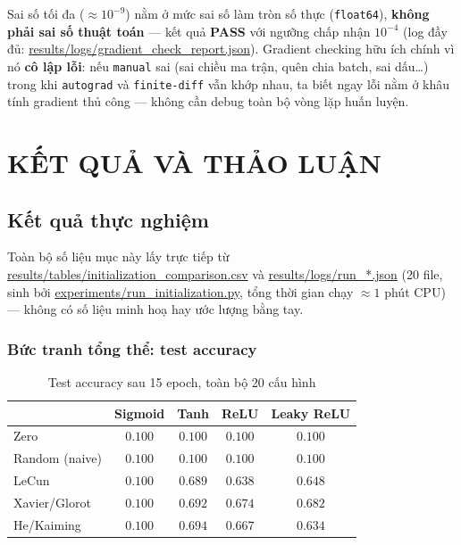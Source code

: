 \documentclass[12pt,a4paper]{report}
\begin{document}
Sai số tối đa ($\approx10^{-9}$) nằm ở mức sai số làm tròn số thực
(\texttt{float64}), \textbf{không phải sai số thuật toán} --- kết quả
\textbf{PASS} với ngưỡng chấp nhận $10^{-4}$ (log đầy đủ:
\url{results/logs/gradient_check_report.json}). Gradient checking hữu
ích chính vì nó \textbf{cô lập lỗi}: nếu \texttt{manual} sai (sai chiều ma
trận, quên chia batch, sai dấu\ldots) trong khi \texttt{autograd} và
\texttt{finite-diff} vẫn khớp nhau, ta biết ngay lỗi nằm ở khâu tính
gradient thủ công --- không cần debug toàn bộ vòng lặp huấn luyện.

\chapter{KẾT QUẢ VÀ THẢO LUẬN}
\section{Kết quả thực nghiệm}
\label{sec:results}

Toàn bộ số liệu mục này lấy trực tiếp từ
\url{results/tables/initialization_comparison.csv} và
\url{results/logs/run_*.json} (20 file, sinh bởi
\url{experiments/run_initialization.py}, tổng thời gian chạy $\approx1$
phút CPU) --- không có số liệu minh hoạ hay ước lượng bằng tay.

\subsection{Bức tranh tổng thể: test accuracy}

\begin{table}[htbp]
\centering
\caption{Test accuracy sau 15 epoch, toàn bộ 20 cấu hình}
\begin{tabular}{@{}lcccc@{}}
\toprule
 & Sigmoid & Tanh & ReLU & Leaky ReLU \\
\midrule
Zero & $0.100$ & $0.100$ & $0.100$ & $0.100$ \\
Random (naive) & $0.100$ & $0.100$ & $0.100$ & $0.100$ \\
LeCun & $0.100$ & $0.689$ & $0.638$ & $0.648$ \\
Xavier/Glorot & $0.100$ & $0.692$ & $0.674$ & $0.682$ \\
He/Kaiming & $0.100$ & $0.694$ & $0.667$ & $0.634$ \\
\bottomrule
\end{tabular}
\label{tab:results_grid}
\end{table}
\end{document}
